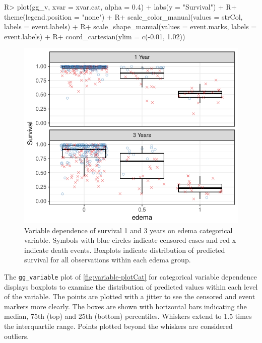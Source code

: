 \documentclass[article, nojss]{jss}
\begin{document}
\begin{Schunk}
\begin{Sinput}
R> plot(gg_v, xvar = xvar.cat, alpha = 0.4) + labs(y = "Survival") +
R+   theme(legend.position = "none") +
R+   scale_color_manual(values = strCol, labels = event.labels) +
R+   scale_shape_manual(values = event.marks, labels = event.labels) +
R+   coord_cartesian(ylim = c(-0.01, 1.02))
\end{Sinput}
\begin{figure}[!htb]

{\centering \includegraphics{rfs-variable-plotCat-1}

}

\caption[Variable dependence of survival 1 and 3 years on edema categorical variable]{Variable dependence of survival 1 and 3 years on edema categorical variable. Symbols with blue circles indicate censored cases and red x indicate death events. Boxplots indicate distribution of predicted survival for all observations within each edema group.}\label{fig:variable-plotCat}
\end{figure}
\end{Schunk}

The \texttt{gg\_variable} plot of \autoref{fig:variable-plotCat} for
categorical variable dependence displays boxplots to examine the
distribution of predicted values within each level of the variable. The
points are plotted with a jitter to see the censored and event markers
more clearly. The boxes are shown with horizontal bars indicating the
median, 75th (top) and 25th (bottom) percentiles. Whiskers extend to 1.5
times the interquartile range. Points plotted beyond the whiskers are
considered outliers.
\end{document}
